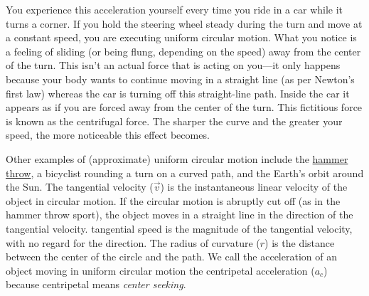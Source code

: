 \documentclass[main.tex]{subfiles}
\begin{document}
\vspace{1em}

You experience this acceleration yourself every time you ride in a car while it turns a corner. If you hold the steering wheel steady during the turn and move at a constant speed, you are executing uniform circular motion. What you notice is a feeling of sliding (or being flung, depending on the speed) away from the center of the turn. This isn't an actual force that is acting on you---it only happens because your body wants to continue moving in a straight line (as per Newton's first law) whereas the car is turning off this straight-line path. Inside the car it appears as if you are forced away from the center of the turn. This fictitious force is known as the \gls{centrifugal force}. The sharper the curve and the greater your speed, the more noticeable this effect becomes.

\begin{center}
\captionsetup{type=figure,margin=1in,font=scriptsize}
\label{4QmpMJ}
\end{center}

Other examples of (approximate) uniform circular motion include the \href{https://youtu.be/3NYlYN-QTig}{hammer throw}, a bicyclist rounding a turn on a curved path, and the Earth's orbit around the Sun. The \gls{tangential velocity} ($\vec{v}$) is the instantaneous linear velocity of the object in circular motion. If the circular motion is abruptly cut off (as in the hammer throw sport), the object moves in a straight line in the direction of the tangential velocity. \Gls{tangential speed} is the magnitude of the tangential velocity, with no regard for the direction. The \gls{radius of curvature} ($r$) is the distance between the center of the circle and the path. We call the acceleration of an object moving in uniform circular motion the \gls{centripetal acceleration} ($a_c$) because centripetal means \textit{center seeking}.
\end{document}

